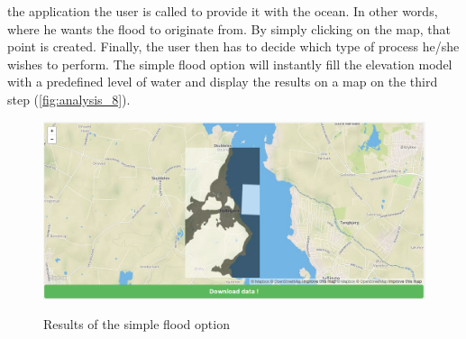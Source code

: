 the application the user is called to provide it with the ocean. In other words, where he wants the flood to originate from. By simply clicking on the map, that point is created. 
Finally, the user then has to decide which type of process he/she wishes to perform. The simple flood option will instantly fill the elevation model with a predefined level of water and display the results on a map on the third step (\autoref{fig:analysis_8}).

\begin{figure}[h!]
\centering
	{\includegraphics[width=0.75\linewidth]{gfx/Analysis_Website/8.png}}
\caption{Results of the simple flood option}
\label{fig:analysis_8}
\end{figure}
